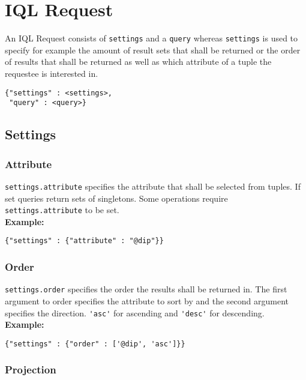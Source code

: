 \documentclass[a4paper]{article}
\begin{document}
\section{IQL Request}

An IQL Request consists of \verb|settings| and a \verb|query| whereas
\verb|settings| is used to specify for example the amount of result
sets that shall be returned or the order of results that shall be
returned as well as which attribute of a tuple the requestee is
interested in.

\begin{verbatim}
{"settings" : <settings>,
 "query" : <query>}
\end{verbatim}

\subsection{Settings}

\subsubsection{Attribute}

\verb|settings.attribute| specifies the attribute that shall be selected from tuples. If set queries return sets of singletons. Some operations require \verb|settings.attribute| to be set. \\

\textbf{Example:}
\begin{verbatim}
{"settings" : {"attribute" : "@dip"}}
\end{verbatim}

\subsubsection{Order}

\verb|settings.order| specifies the order the results shall be
returned in. The first argument to order specifies the attribute to
sort by and the second argument specifies the direction.
\verb|'asc'| for ascending and \verb|'desc'| for descending.\\

\textbf{Example:}
\begin{verbatim}
{"settings" : {"order" : ['@dip', 'asc']}}
\end{verbatim}

\subsubsection{Projection}
\end{document}
